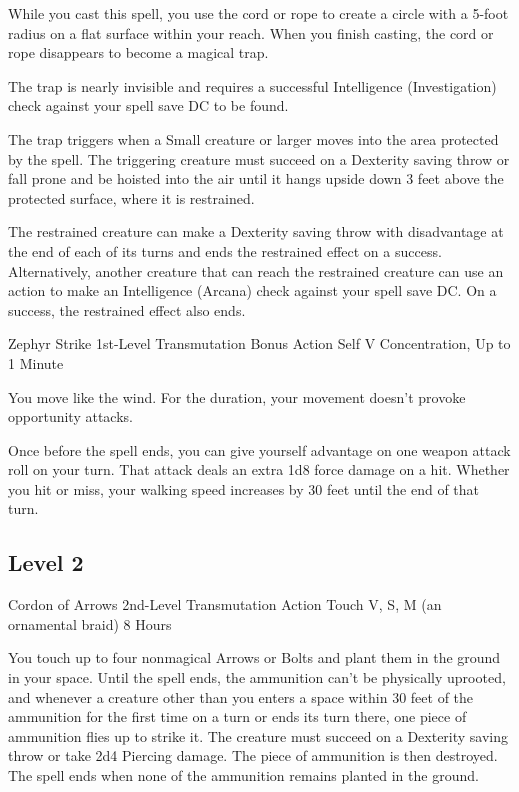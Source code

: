 \documentclass[letterpaper,openany,oneside,twocolumn]{book}
\begin{document}
While you cast this spell, you use the cord or rope to create a circle with a 5-foot radius on a flat surface within your reach. When you finish casting, the cord or rope disappears to become a magical trap.

The trap is nearly invisible and requires a successful Intelligence (Investigation) check against your spell save DC to be found.

The trap triggers when a Small creature or larger moves into the area protected by the spell. The triggering creature must succeed on a Dexterity saving throw or fall prone and be hoisted into the air until it hangs upside down 3 feet above the protected surface, where it is restrained.

The restrained creature can make a Dexterity saving throw with disadvantage at the end of each of its turns and ends the restrained effect on a success. Alternatively, another creature that can reach the restrained creature can use an action to make an Intelligence (Arcana) check against your spell save DC. On a success, the restrained effect also ends.

\DndSpellHeader
  {Zephyr Strike}
  {1st-Level Transmutation}
  {Bonus Action}
  {Self}
  {V}
  {Concentration, Up to 1 Minute}

You move like the wind. For the duration, your movement doesn't provoke opportunity attacks.

Once before the spell ends, you can give yourself advantage on one weapon attack roll on your turn. That attack deals an extra 1d8 force damage on a hit. Whether you hit or miss, your walking speed increases by 30 feet until the end of that turn.

\subsection*{Level 2}

\DndSpellHeader
  {Cordon of Arrows}
  {2nd-Level Transmutation}
  {Action}
  {Touch}
  {V, S, M (an ornamental braid)}
  {8 Hours}

You touch up to four nonmagical Arrows or Bolts and plant them in the ground in your space. Until the spell ends, the ammunition can't be physically uprooted, and whenever a creature other than you enters a space within 30 feet of the ammunition for the first time on a turn or ends its turn there, one piece of ammunition flies up to strike it. The creature must succeed on a Dexterity saving throw or take 2d4 Piercing damage. The piece of ammunition is then destroyed. The spell ends when none of the ammunition remains planted in the ground.
\end{document}
